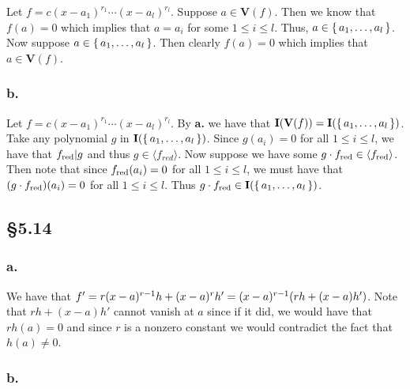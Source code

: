 \documentclass[letterpaper]{article}
\begin{document}
Let $f = c(x - a_{1})^{r_{1}} \cdots (x - a_{l})^{r_{l}}$.
Suppose $a \in \mathbf{V}(f)$.
Then we know that $f(a) = 0$ which implies that $a = a_{i}$ for some $1 \leq i \leq l$.
Thus, $a \in \set{a_{1}, \ldots, a_{l}}$.
Now suppose $a \in \set{a_{1}, \ldots, a_{l}}$.
Then clearly $f(a) = 0$ which implies that $a \in \textbf{V}(f)$.

\subsubsection*{b.}

Let $f = c(x - a_{1})^{r_{1}} \cdots (x - a_{l})^{r_{l}}$.
By \textbf{a.} we have that $\mathbf{I}(\textbf{V}(f)) = \mathbf{I}\pqty{\set{a_{1}, \ldots, a_{l}}}$.
Take any polynomial $g$ in $\mathbf{I}\pqty{\set{a_{1}, \ldots, a_{l}}}$.
Since $g(a_{i}) = 0$ for all $1 \leq i \leq l$, we have that $f_{\text{red}} | g$ and thus $g \in \langle f_{red} \rangle$.
Now suppose we have some $g \cdot f_{\text{red}} \in \langle f_{\text{red}} \rangle$.
Then note that since $f_{\text{red}}(a_{i}) = 0$ for all $1 \leq i \leq l$, we must have that $\pqty{g \cdot f_{\red}}(a_{i}) = 0$ for all $1 \leq i \leq l$.
Thus $g \cdot f_{\red} \in \mathbf{I}\pqty{\set{a_{1}, \ldots, a_{l}}}$.

\subsection*{\S 5.14}

\subsubsection*{a.}

We have that $f' = r(x - a)^{r - 1} h + (x - a)^{r} h' = (x - a)^{r-1} \pqty{rh + (x - a)h'}$.
Note that $rh + (x - a)h'$ cannot vanish at $a$ since if it did, we would have that $rh(a) = 0$ and since $r$ is a nonzero constant we would contradict the fact that $h(a) \neq 0$.

\subsubsection*{b.}
\end{document}
